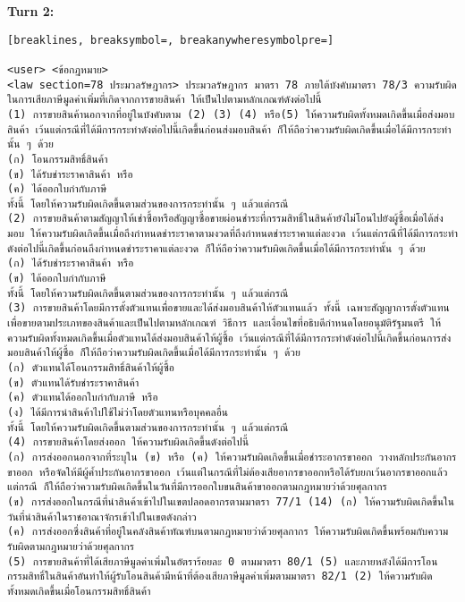 \textbf{Turn 2: }
\begin{Verbatim}[breaklines, breaksymbol=, breakanywheresymbolpre=]

<user> <ข้อกฎหมาย>
<law section=78 ประมวลรัษฎากร> ประมวลรัษฎากร มาตรา 78 ภายใต้บังคับมาตรา 78/3 ความรับผิดในการเสียภาษีมูลค่าเพิ่มที่เกิดจากการขายสินค้า ให้เป็นไปตามหลักเกณฑ์ดังต่อไปนี้
(1) การขายสินค้านอกจากที่อยู่ในบังคับตาม (2) (3) (4) หรือ(5) ให้ความรับผิดทั้งหมดเกิดขึ้นเมื่อส่งมอบสินค้า เว้นแต่กรณีที่ได้มีการกระทำดังต่อไปนี้เกิดขึ้นก่อนส่งมอบสินค้า ก็ให้ถือว่าความรับผิดเกิดขึ้นเมื่อได้มีการกระทำนั้น ๆ ด้วย
(ก) โอนกรรมสิทธิ์สินค้า
(ข) ได้รับชำระราคาสินค้า หรือ
(ค) ได้ออกใบกำกับภาษี
ทั้งนี้ โดยให้ความรับผิดเกิดขึ้นตามส่วนของการกระทำนั้น ๆ แล้วแต่กรณี
(2) การขายสินค้าตามสัญญาให้เช่าซื้อหรือสัญญาซื้อขายผ่อนชำระที่กรรมสิทธิ์ในสินค้ายังไม่โอนไปยังผู้ซื้อเมื่อได้ส่งมอบ ให้ความรับผิดเกิดขึ้นเมื่อถึงกำหนดชำระราคาตามงวดที่ถึงกำหนดชำระราคาแต่ละงวด เว้นแต่กรณีที่ได้มีการกระทำดังต่อไปนี้เกิดขึ้นก่อนถึงกำหนดชำระราคาแต่ละงวด ก็ให้ถือว่าความรับผิดเกิดขึ้นเมื่อได้มีการกระทำนั้น ๆ ด้วย
(ก) ได้รับชำระราคาสินค้า หรือ
(ข) ได้ออกใบกำกับภาษี
ทั้งนี้ โดยให้ความรับผิดเกิดขึ้นตามส่วนของการกระทำนั้น ๆ แล้วแต่กรณี
(3) การขายสินค้าโดยมีการตั้งตัวแทนเพื่อขายและได้ส่งมอบสินค้าให้ตัวแทนแล้ว ทั้งนี้ เฉพาะสัญญาการตั้งตัวแทนเพื่อขายตามประเภทของสินค้าและเป็นไปตามหลักเกณฑ์ วิธีการ และเงื่อนไขที่อธิบดีกำหนดโดยอนุมัติรัฐมนตรี ให้ความรับผิดทั้งหมดเกิดขึ้นเมื่อตัวแทนได้ส่งมอบสินค้าให้ผู้ซื้อ เว้นแต่กรณีที่ได้มีการกระทำดังต่อไปนี้เกิดขึ้นก่อนการส่งมอบสินค้าให้ผู้ซื้อ ก็ให้ถือว่าความรับผิดเกิดขึ้นเมื่อได้มีการกระทำนั้น ๆ ด้วย
(ก) ตัวแทนได้โอนกรรมสิทธิ์สินค้าให้ผู้ซื้อ
(ข) ตัวแทนได้รับชำระราคาสินค้า
(ค) ตัวแทนได้ออกใบกำกับภาษี หรือ
(ง) ได้มีการนำสินค้าไปใช้ไม่ว่าโดยตัวแทนหรือบุคคลอื่น
ทั้งนี้ โดยให้ความรับผิดเกิดขึ้นตามส่วนของการกระทำนั้น ๆ แล้วแต่กรณี
(4) การขายสินค้าโดยส่งออก ให้ความรับผิดเกิดขึ้นดังต่อไปนี้
(ก) การส่งออกนอกจากที่ระบุใน (ข) หรือ (ค) ให้ความรับผิดเกิดขึ้นเมื่อชำระอากรขาออก วางหลักประกันอากรขาออก หรือจัดให้มีผู้ค้ำประกันอากรขาออก เว้นแต่ในกรณีที่ไม่ต้องเสียอากรขาออกหรือได้รับยกเว้นอากรขาออกแล้วแต่กรณี ก็ให้ถือว่าความรับผิดเกิดขึ้นในวันที่มีการออกใบขนสินค้าขาออกตามกฎหมายว่าด้วยศุลกากร
(ข) การส่งออกในกรณีที่นำสินค้าเข้าไปในเขตปลอดอากรตามมาตรา 77/1 (14) (ก) ให้ความรับผิดเกิดขึ้นในวันที่นำสินค้าในราชอาณาจักรเข้าไปในเขตดังกล่าว
(ค) การส่งออกซึ่งสินค้าที่อยู่ในคลังสินค้าทัณฑ์บนตามกฎหมายว่าด้วยศุลกากร ให้ความรับผิดเกิดขึ้นพร้อมกับความรับผิดตามกฎหมายว่าด้วยศุลกากร
(5) การขายสินค้าที่ได้เสียภาษีมูลค่าเพิ่มในอัตราร้อยละ 0 ตามมาตรา 80/1 (5) และภายหลังได้มีการโอนกรรมสิทธิ์ในสินค้าอันทำให้ผู้รับโอนสินค้ามีหน้าที่ต้องเสียภาษีมูลค่าเพิ่มตามมาตรา 82/1 (2) ให้ความรับผิดทั้งหมดเกิดขึ้นเมื่อโอนกรรมสิทธิ์สินค้า

\end{Verbatim}
